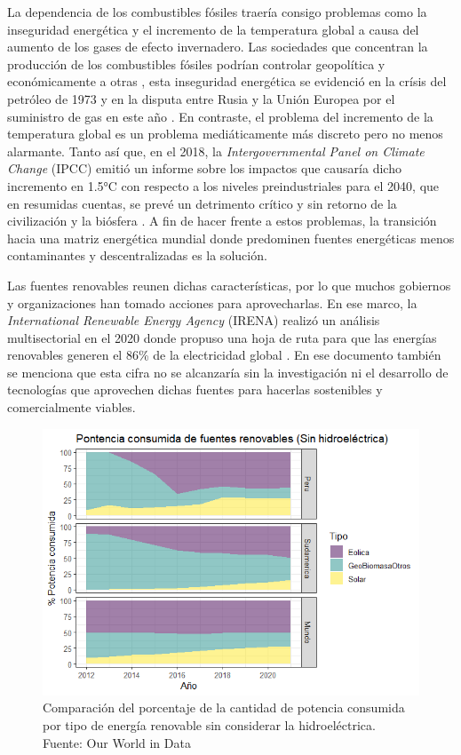 
La dependencia de los combustibles fósiles traería consigo problemas como la inseguridad energética y el incremento de la temperatura global a causa del aumento de los gases de efecto invernadero. Las sociedades que concentran la producción de los combustibles fósiles podrían controlar geopolítica y económicamente a otras \cite{mayer2022fossil}, esta inseguridad energética se evidenció en la crísis del petróleo de 1973 \cite{vernon1976oil} y en la disputa entre Rusia y la Unión Europea por el suministro de gas en este año \cite{rodriguez2022improving}. En contraste, el problema del incremento de la temperatura global es un problema mediáticamente más discreto pero no menos alarmante. Tanto así que, en el 2018, la \textit{Intergovernmental Panel on Climate Change} (IPCC) emitió un informe sobre los impactos que causaría dicho incremento en 1.5°C con respecto a los niveles preindustriales para el 2040, que en resumidas cuentas, se prevé un detrimento crítico y sin retorno de la civilización y la biósfera \cite{guilyardi2018ipcc}. A fin de hacer frente a estos problemas, la transición hacia una matriz energética mundial donde predominen fuentes energéticas menos contaminantes y descentralizadas es la solución. 



Las fuentes renovables reunen dichas características, por lo que muchos gobiernos y organizaciones han tomado acciones para aprovecharlas. En ese marco, la \textit{International Renewable Energy Agency} (IRENA) realizó un análisis multisectorial en el 2020 donde propuso una hoja de ruta para que las energías renovables generen el 86\% de la electricidad global \cite{asmelash2020role}. En ese documento también se menciona que esta cifra no se alcanzaría sin la investigación ni el desarrollo de tecnologías que aprovechen dichas fuentes para hacerlas sostenibles y comercialmente viables.

\begin{figure}[!ht]
    \begin{center}
        \includegraphics[scale=0.80]{img/PorcentajeRenovable.png}
    \end{center}
    \caption{Comparación del porcentaje de la cantidad de potencia consumida por tipo de energía renovable sin considerar la hidroeléctrica.
    Fuente: Our World in Data \cite{owidenergy}}
    \label{img:PorcentajeRenovable}
\end{figure}

